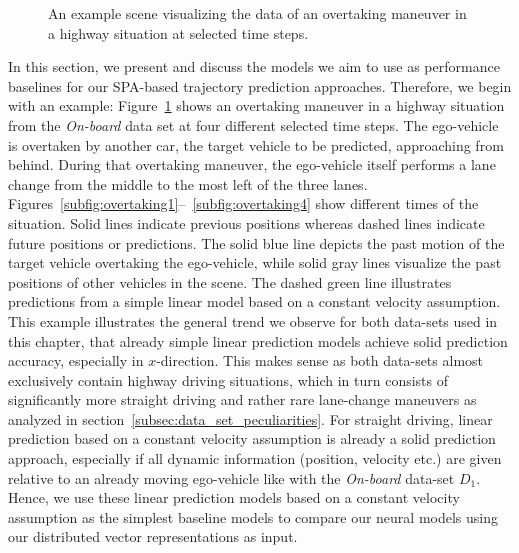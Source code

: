 \begin{figure}[th!]
	\centering
	\vspace{-0.3cm}
	\vspace{-0.3cm}
	\vspace{-0.3cm}
	\caption{An example scene visualizing the data of an overtaking maneuver in a highway situation at selected time steps.}
    \label{fig:overtaking}
\end{figure}

In this section, we present and discuss the models we aim to use as performance baselines for our \ac{SPA}-based trajectory prediction approaches.
Therefore, we begin with an example:
Figure~\ref{fig:overtaking} shows an overtaking maneuver in a highway situation from the \emph{On-board} data set at four different selected time steps.
The ego-vehicle is overtaken by another car, the target vehicle to be predicted, approaching from behind.
During that overtaking maneuver, the ego-vehicle itself performs a lane change from the middle to the most left of the three lanes.
Figures~\ref{subfig:overtaking1}--~\ref{subfig:overtaking4} show different times of the situation.
Solid lines indicate previous positions whereas dashed lines indicate future positions or predictions.
The solid blue line depicts the past motion of the target vehicle overtaking the ego-vehicle, while solid gray lines visualize the past positions of other vehicles in the scene.
The dashed green line illustrates predictions from a simple linear model based on a constant velocity assumption.
This example illustrates the general trend we observe for both data-sets used in this chapter, that already simple linear prediction models achieve solid prediction accuracy, especially in $x$-direction.
This makes sense as both data-sets almost exclusively contain highway driving situations, which in turn consists of significantly more straight driving and rather rare lane-change maneuvers as analyzed in section~\ref{subsec:data_set_peculiarities}.
For straight driving, linear prediction based on a constant velocity assumption is already a solid prediction approach, especially if all dynamic information (position, velocity etc.) are given relative to an already moving ego-vehicle like with the \emph{On-board} data-set $D_1$.
Hence, we use these linear prediction models based on a constant velocity assumption as the simplest baseline models to compare our neural models using our distributed vector representations as input.

